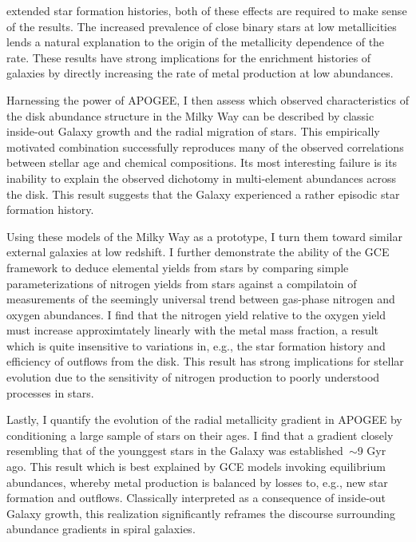\documentclass[main.tex]{subfiles}
\begin{document}
extended star formation histories, both of these effects are required to
make sense of the results.
The increased prevalence of close binary stars at low metallicities lends a
natural explanation to the origin of the metallicity dependence of the rate.
These results have strong implications for the enrichment histories of galaxies
by directly increasing the rate of metal production at low abundances.
\par
Harnessing the power of APOGEE, I then assess which observed characteristics of
the disk abundance structure in the Milky Way can be described by classic
inside-out Galaxy growth and the radial migration of stars.
This empirically motivated combination successfully reproduces many of the
observed correlations between stellar age and chemical compositions.
Its most interesting failure is its inability to explain the observed dichotomy
in multi-element abundances across the disk.
This result suggests that the Galaxy experienced a rather episodic star
formation history.
\par
Using these models of the Milky Way as a prototype, I turn them toward similar
external galaxies at low redshift.
I further demonstrate the ability of the GCE framework to deduce elemental
yields from stars by comparing simple parameterizations of nitrogen yields from
stars against a compilatoin of measurements of the seemingly universal trend
between gas-phase nitrogen and oxygen abundances.
I find that the nitrogen yield relative to the oxygen yield must increase
approximtately linearly with the metal mass fraction, a result which is quite
insensitive to variations in, e.g., the star formation history and efficiency
of outflows from the disk.
This result has strong implications for stellar evolution due to the sensitivity
of nitrogen production to poorly understood processes in stars.
\par
Lastly, I quantify the evolution of the radial metallicity gradient in APOGEE
by conditioning a large sample of stars on their ages.
I find that a gradient closely resembling that of the younggest stars in the
Galaxy was established~$\sim$9 Gyr ago.
This result which is best explained by GCE models invoking equilibrium
abundances, whereby metal production is balanced by losses to, e.g., new star
formation and outflows.
Classically interpreted as a consequence of inside-out Galaxy growth, this
realization significantly reframes the discourse surrounding abundance
gradients in spiral galaxies.
\end{document}
